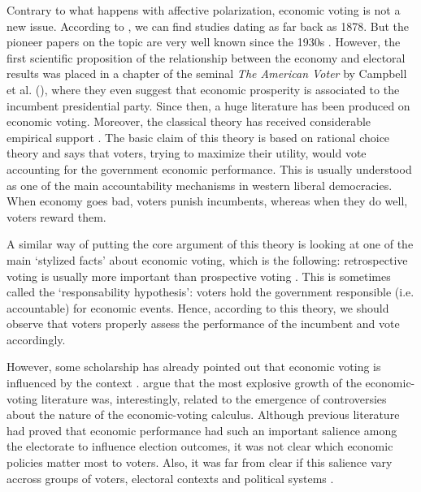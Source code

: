 \documentclass[a4paper, svgnames]{article}
\begin{document}
Contrary to what happens with affective polarization, economic voting is not a new issue. According to \cite{Lewis-Beck2018}, we can find studies dating as far back as 1878. But the pioneer papers on the topic are very well known since the 1930s \citep{Tibbitts2015, Gosnell1940, Wilkinson1950}. However, the first scientific proposition of the relationship between the economy and electoral results was placed in a chapter of the seminal \textit{The American Voter} by Campbell et al. (\citeyear[Chapter 14]{Campbell1960}), where they even suggest that economic prosperity is associated to the incumbent presidential party. Since then, a huge literature has been produced on economic voting. Moreover, the classical theory has received considerable empirical support \citep{Kinder1979, Lewis-Beck1988, Lewis-Beck2000, LewisBeck2007, Lewis-Beck2011}. The basic claim of this theory is based on rational choice theory and says that voters, trying to maximize their utility, would vote accounting for the government economic performance. This is usually understood as one of the main accountability mechanisms in western liberal democracies. When economy goes bad, voters punish incumbents, whereas when they do well, voters reward them.

A similar way of putting the core argument of this theory is looking at one of the main `stylized facts' about economic voting, which is the following: retrospective voting is usually more important than prospective voting \citep{Lewis-Beck2000}. This is sometimes called the `responsability hypothesis': voters hold the government responsible (i.e. accountable) for economic events. Hence, according to this theory, we should observe that voters properly assess the performance of the incumbent and vote accordingly. 

However, some scholarship has already pointed out that economic voting is influenced by the context \citep{Dorussen2002, Anderson2007, Singer2015}. \cite{Dorussen2002} argue that the most explosive growth of the economic-voting literature was, interestingly, related to the emergence of controversies about the nature of the economic-voting calculus. Although previous literature had proved that economic performance had such an important salience among the electorate to influence election outcomes, it was not clear which economic policies matter most to voters. Also, it was far from clear if this salience vary accross groups of voters, electoral contexts and political systems \citep{Dorussen2002}.
\end{document}
